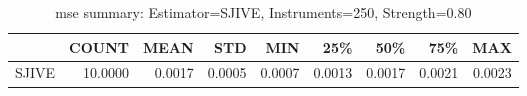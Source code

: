 \begin{table}[ht]
\centering
\caption{mse summary: Estimator=SJIVE, Instruments=250, Strength=0.80}
\begin{tabular}{lrrrrrrrr}
\toprule
 & COUNT & MEAN & STD & MIN & 25\% & 50\% & 75\% & MAX \\
\midrule
SJIVE & 10.0000 & 0.0017 & 0.0005 & 0.0007 & 0.0013 & 0.0017 & 0.0021 & 0.0023 \\
\bottomrule
\end{tabular}
\end{table}
